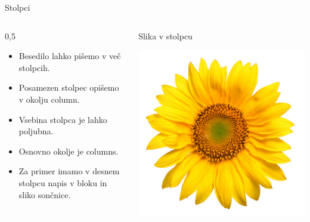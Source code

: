 \documentclass{beamer}
\begin{document}
   
   \begin{frame}
      {Stolpci}
               \begin{columns}[t]
                  \begin{column}{0,5\textwidth}
                     \begin{itemize}
                        \item Besedilo lahko pišemo v več stolpcih.
                        \item Posamezen stolpec opišemo v okolju column.
                        \item Vsebina stolpca je lahko poljubna.
                        \item Osnovno okolje je columns.
                        \item Za primer imamo v desnem stolpcu napis v bloku in sliko sončnice.
                     \end{itemize}
                  \end{column}

                  \begin{column}{0.5\textwidth}
                     \centering
                  \begin{exampleblock}{}
                     \centering
                     Slika v stolpcu
                  \end{exampleblock} 
                     \includegraphics{soncnica.jpg}
                  \end{column}
               \end{columns}
   
   \end{frame}
\end{document}
